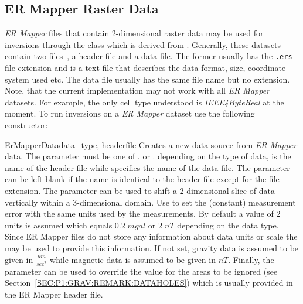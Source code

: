 \subsection{ER Mapper Raster Data}\label{sec:ref:DataSource:ERM}
\emph{ER Mapper} files that contain 2-dimensional raster data may be used for
inversions through the  class which is derived from
.
Generally, these datasets contain two files~\cite{ERMAPPER}, a header file and a data file.
The former usually has the \texttt{.ers} file extension and is a text file that
describes the data format, size, coordinate system used etc.
The data file usually has the same file name but no extension.
Note, that the current implementation may not work with all \emph{ER Mapper}
datasets. For example, the only cell type understood is \emph{IEEE4ByteReal}
at the moment.
To run inversions on a \emph{ER Mapper} dataset use the following constructor:
\begin{classdesc}{ErMapperData}{data_type, headerfile%
%
%
%
%
}
Creates a new data source from \emph{ER Mapper} data.
The parameter  must be one of
. or .
depending on the type of data,  is the name of the header
file while  specifies the name of the data file.
The parameter  can be left blank if the name is identical to
the header file except for the file extension.
The  parameter can be used to shift a 2-dimensional slice of
data vertically within a 3-dimensional domain.
Use  to set the (constant) measurement error with the same units
used by the measurements. By default a value of $2$ units is assumed which
equals $0.2 \; mgal$ or $2 \; nT$ depending on the data type.
Since ER Mapper files do not store any information about data units or scale
the  may be used to provide this information.
If not set, gravity data is assumed to be given in $\frac{\mu m}{sec^2}$ while
magnetic data is assumed to be given in $nT$.
Finally, the  parameter can be used to override the value
for the areas to be ignored (see Section~\ref{SEC:P1:GRAV:REMARK:DATAHOLES})
which is usually provided in the ER Mapper header file.
\end{classdesc}


